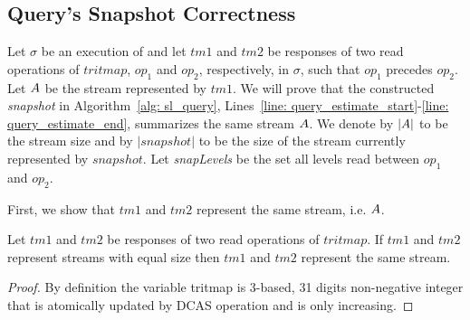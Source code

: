 
\subsection{Query's Snapshot Correctness}
Let $\sigma$ be an execution of \mysketch and let $tm1$ and $tm2$ be responses of two read operations of $tritmap$, $op_1$ and $op_2$, respectively, in $\sigma$, such that $op_1$ precedes $op_2$. Let $\mathnormal{A}$ be the stream represented by $tm1$. We will prove that the constructed \emph{snapshot} in Algorithm~\ref{alg: sl_query}, Lines~\ref{line: query_estimate_start}-\ref{line: query_estimate_end}, summarizes the same stream $\mathnormal{A}$. We denote by $|\mathnormal{A}|$ to be the stream size and by $|snapshot|$ to be the size of the stream currently represented by $snapshot$.
Let \emph{snapLevels} be the set all levels read between $op_1$ and $op_2$.

First, we show that $tm1$ and $tm2$ represent the same stream, i.e.  $\mathnormal{A}$.

\begin{lemma}
Let $tm1$ and $tm2$ be responses of two read operations of $tritmap$.
If $tm1$ and $tm2$ represent streams with equal size then $tm1$ and $tm2$ represent the same stream.
\end{lemma}
\begin{proof}
By definition the variable tritmap is 3-based, 31 digits non-negative integer that is atomically updated by DCAS operation and is only increasing.   
\end{proof}

